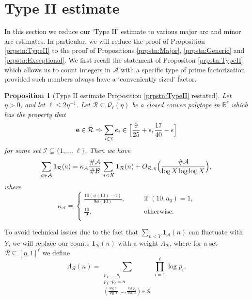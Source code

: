 \documentclass[10pt]{amsart}
\theoremstyle{plain}
\newtheorem*{nprpstn}{Proposition}
\numberwithin{sblmm}{thrm}
\numberwithin{equation}{section}
\begin{document}
\section{Type II estimate}\label{sec:TypeII}
%
%
%
%
In this section we reduce our `Type II' estimate to various major arc and minor arc estimates. In particular, we will reduce the proof of Proposition \ref{prpstn:TypeII} to the proof of Propositions \ref{prpstn:Major}, \ref{prpstn:Generic} and \ref{prpstn:Exceptional}. We first recall the statement of Propositon \ref{prpstn:TypeII} which allows us to count integers in $\mathcal{A}$ with a specific type of prime factorization provided such numbers always have a `conveniently sized' factor.
%
%
%
%
\begin{nprpstn}[Type II estimate Proposition \ref{prpstn:TypeII} restated] \label{prpstn:TypeII2}
%
Let $\eta>0$, and let $\ell\le 2\eta^{-1}$. Let $\mathcal{R}\subseteq \mathcal{Q}_\ell(\eta)$ be a closed convex polytope in $\mathbb{R}^\ell$ which has the property that
\[
\mathbf{e}\in\mathcal{R}\Rightarrow \sum_{i\in\mathcal{I}} e_i\in\Bigl[\frac{9}{25}+\epsilon,\frac{17}{40}-\epsilon\Bigr]
\]
for some set $\mathcal{I}\subseteq\{1,\dots,\ell\}$. Then we have
\[
\sum_{\substack{a\in\mathcal{A}}}\mathbf{1}_{\mathcal{R}}(a)=\kappa_\mathcal{A}\frac{\#\mathcal{A}{}}{\#\mathcal{B}{}}\sum_{n<  X}\mathbf{1}_{\mathcal{R}}(n)+O_{\mathcal{R},\eta}\Bigl(\frac{\#\mathcal{A}}{\log{X}\log\log{X}}\Bigr),
\]
where
\[
\kappa_\mathcal{A}=
\begin{cases}
\frac{10(\phi(10)-1)}{9\phi(10)},\qquad&\text{if $(10,a_0)=1$,}\\
\frac{10}{9},&\text{otherwise.}\\
\end{cases}
\]
%
\end{nprpstn}
%
%
%
%
%
To avoid technical issues due to the fact that $\sum_{n<Y}\mathbf{1}_{\mathcal{A}}(n)$ can fluctuate with $Y$, we will replace our counts $\mathbf{1}_{\mathcal{R}}(n)$ with a weight $\Lambda_{\mathcal{R}}$, where for a set $\mathcal{R}\subseteq [\eta,1]^\ell$ we define
\begin{equation}
\Lambda_\mathcal{R}(n)=\sum_{\substack{p_1,\dots,p_{\ell}\\ p_1\cdots p_\ell=n \\ (\frac{\log{p}_1}{\log{X}},\dots,\frac{\log{p_\ell}}{\log{X}})\in\mathcal{R}}}\prod_{i=1}^\ell \log{p_i}.
\label{eq:LambdaDef}
\end{equation}
\end{document}

